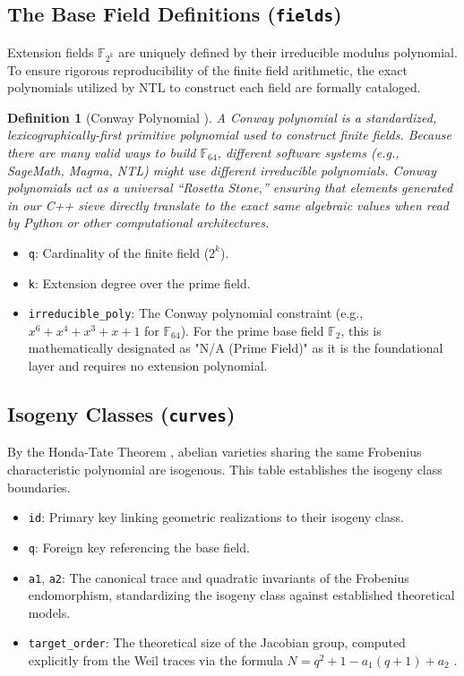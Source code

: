 \documentclass[11pt,letterpaper]{article}
\newtheorem{definition}[theorem]{Definition}
\begin{document}
\subsection{The Base Field Definitions (\texttt{fields})}
Extension fields $\mathbb{F}_{2^k}$ are uniquely defined by their irreducible modulus polynomial. To ensure rigorous reproducibility of the finite field arithmetic, the exact polynomials utilized by NTL to construct each field are formally cataloged.

\begin{definition}[Conway Polynomial \cite{Lidl1997, Parker1990}]
A Conway polynomial is a standardized, lexicographically-first primitive polynomial used to construct finite fields. Because there are many valid ways to build $\mathbb{F}_{64}$, different software systems (e.g., SageMath, Magma, NTL) might use different irreducible polynomials. Conway polynomials act as a universal ``Rosetta Stone,'' ensuring that elements generated in our C++ sieve directly translate to the exact same algebraic values when read by Python or other computational architectures.
\end{definition}

\begin{itemize}
\item \texttt{q}: Cardinality of the finite field ($2^k$).
\item \texttt{k}: Extension degree over the prime field.
\item \texttt{irreducible\_poly}: The Conway polynomial constraint (e.g., $x^6 + x^4 + x^3 + x + 1$ for $\mathbb{F}_{64}$). For the prime base field $\mathbb{F}_2$, this is mathematically designated as "N/A (Prime Field)" as it is the foundational layer and requires no extension polynomial.
\end{itemize}

\subsection{Isogeny Classes (\texttt{curves})}
By the Honda-Tate Theorem \cite{Honda1968}, abelian varieties sharing the same Frobenius characteristic polynomial are isogenous. This table establishes the isogeny class boundaries.
\begin{itemize}
\item \texttt{id}: Primary key linking geometric realizations to their isogeny class.
\item \texttt{q}: Foreign key referencing the base field.
\item \texttt{a1}, \texttt{a2}: The canonical trace and quadratic invariants of the Frobenius endomorphism, standardizing the isogeny class against established theoretical models.
\item \texttt{target\_order}: The theoretical size of the Jacobian group, computed explicitly from the Weil traces via the formula $N = q^2 + 1 - a_1(q + 1) + a_2$ \cite{Waterhouse1969}.
\end{itemize}
\end{document}
